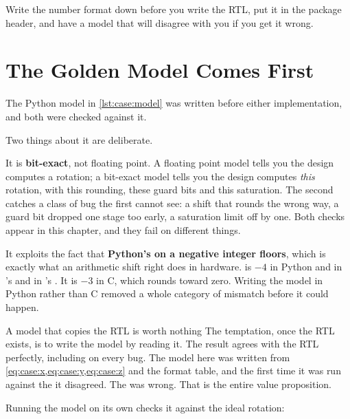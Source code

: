 \begin{ruleofthumb}
Write the number format down before you write the RTL, put it in the package
header, and have a model that will disagree with you if you get it wrong.
\end{ruleofthumb}

\section{The Golden Model Comes First}
\label{sec:case:model}

The Python model in \cref{lst:case:model} was written
before either implementation, and both were checked against it.

Two things about it are deliberate.

It is \textbf{bit-exact}, not floating point. A floating point model tells
you the design computes a rotation; a bit-exact model tells you the design
computes \emph{this} rotation, with this rounding, these guard bits and this
saturation. The second catches a class of bug the first cannot see: a shift
that rounds the wrong way, a guard bit dropped one stage too early, a
saturation limit off by one. Both checks appear in this chapter, and they
fail on different things.

It exploits the fact that \textbf{Python's \code{>>} on a negative integer
floors}, which is exactly what an arithmetic shift right does in hardware.
 is $-4$ in Python and in \VHDL{}'s  and in
\SV{}'s \code{>>>}. It is $-3$ in C, which rounds toward zero. Writing the
model in Python rather than C removed a whole category of mismatch before it
could happen.

\begin{gotcha}{A model that copies the RTL is worth nothing}
The temptation, once the RTL exists, is to write the model by reading it.
The result agrees with the RTL perfectly, including on every bug. The model
here was written from \cref{eq:case:x,eq:case:y,eq:case:z} and the format
table, and the first time it was run against the \VHDL{} it disagreed. The
\VHDL{} was wrong. That is the entire value proposition.
\end{gotcha}

Running the model on its own checks it against the ideal rotation:


